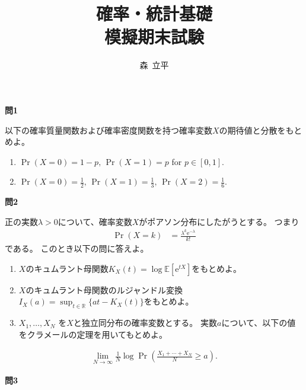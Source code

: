 \documentclass[lualatex,ja=standard,a4paper]{bxjsarticle}
\title{確率・統計基礎\\
模擬期末試験}
\author{森~立平}
\date{}
\theoremstyle{definition}
\theoremstyle{remark}
\begin{document}
\maketitle


\vspace{1em}
{\noindent\large\bfseries 問1}

\vspace{1em}
以下の確率質量関数および確率密度関数を持つ確率変数$X$の期待値と分散をもとめよ。

\vspace{1em}
\begin{enumerate}[label=(\arabic*)]
\setlength{\itemsep}{1em}
\item
$\Pr(X=0)=1-p,\,\Pr(X=1)=p$ for $p\in[0,1]$.
\item
$\Pr(X=0)=\frac12,\,\Pr(X=1)=\frac13,\,\Pr(X=2)=\frac{1}{6}$.
\end{enumerate}

\vspace{1em}
{\noindent\large\bfseries 問2}

\vspace{1em}
正の実数$\lambda>0$について、確率変数$X$がポアソン分布にしたがうとする。
つまり
\begin{align*}
\Pr(X = k) &=  \frac{\lambda^k\mathrm{e}^{-\lambda}}{k!}
\end{align*}
である。
このとき以下の問に答えよ。
\vspace{1em}
\begin{enumerate}[label=(\arabic*)]
\setlength{\itemsep}{1em}
\item $X$のキュムラント母関数$K_X(t)=\log\mathbb{E}[\mathrm{e}^{tX}]$をもとめよ。
\item $X$のキュムラント母関数のルジャンドル変換$I_X(a) = \sup_{t\in\mathbb{R}}\{at - K_X(t)\}$をもとめよ。
\item $X_1,\dotsc,X_N$ を$X$と独立同分布の確率変数とする。
実数$a$について、以下の値をクラメールの定理を用いてもとめよ。
\end{enumerate}
\begin{align*}
\lim_{N\to\infty}\frac1N\log\Pr\left(\frac{X_1+\dotsb+X_N}{N} \ge a\right).
\end{align*}


\newpage
{\noindent\large\bfseries 問3}
\end{document}
